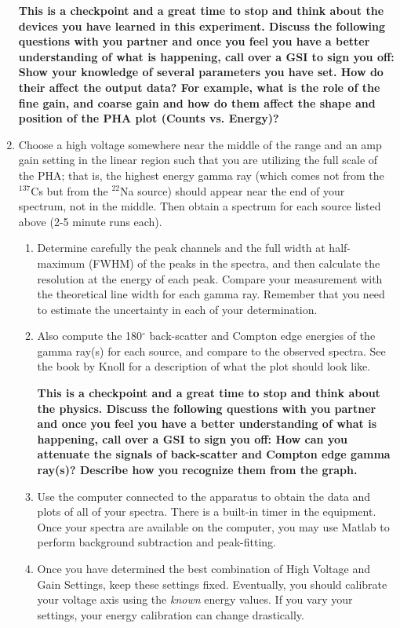 \documentclass{../lab}
\begin{document}
\begin{enumerate}
    \textbf{This is a checkpoint and a great time to stop and think about the devices you have learned in this experiment. Discuss the following questions with you partner and once you feel you have a better understanding of what is happening, call over a GSI to sign you off: Show your knowledge of several parameters you have set. How do their affect the output data? For example, what is the role of the fine gain, and coarse gain and how do them affect the shape and position of the PHA plot (Counts vs. Energy)?}

    \item Choose a high voltage somewhere near the middle of the range and an amp gain setting in the linear region such that you are utilizing the full scale of the PHA; that is, the highest energy gamma ray (which comes not from the $^{137}$Cs but from the $^{22}$Na source) should appear near the end of your spectrum, not in the middle. Then obtain a spectrum for each source listed above (2-5 minute runs each).
    \begin{enumerate}
        \item Determine carefully the peak channels and the full width at half-maximum (FWHM) of the peaks in the spectra, and then calculate the resolution at the energy of each peak. Compare your measurement with the theoretical line width for each gamma ray. Remember that you need to estimate the uncertainty in each of your determination.

        \item Also compute the 180$^\circ$ back-scatter and Compton edge energies of the gamma ray(s) for each source, and compare to the observed spectra. See the book by Knoll for a description of what the plot should look like.
        
        \textbf{This is a checkpoint and a great time to stop and think about the physics. Discuss the following questions with you partner and once you feel you have a better understanding of what is happening, call over a GSI to sign you off: How can you attenuate the signals of back-scatter and Compton edge gamma ray(s)? Describe how you recognize them from the graph.}

        \item Use the computer connected to the apparatus to obtain the data and plots of all of your spectra. There is a built-in timer in the equipment. Once your spectra are available on the computer, you may use Matlab to perform background subtraction and peak-fitting.

        \item Once you have determined the best combination of High Voltage and Gain Settings, keep these settings fixed. Eventually, you should calibrate your voltage axis using the \emph{known} energy values. If you vary your settings, your energy calibration can change drastically.


\end{enumerate}
\end{enumerate}
\end{document}

